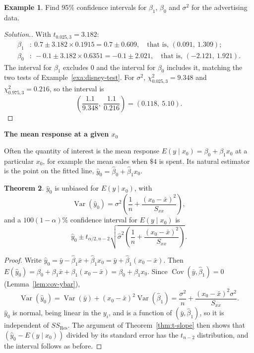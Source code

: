 \documentclass[11pt,a4paper]{article}
\numberwithin{equation}{section}
\theoremstyle{definition}
\newtheorem{thm}{Theorem}[subsection]
\newtheorem{exa}[thm]{Example}
\newenvironment{solution}
  {\renewcommand{\qedsymbol}{}\begin{proof}[\textit{Solution}.]}
  {\end{proof}}
\newcommand{\subhead}[1]{%
  \par\medskip\noindent\textbf{#1}\par\nobreak\smallskip}
\begin{document}
\begin{exa}\label{exa:disney-ci}
Find 95\% confidence intervals for $\beta_1$, $\beta_0$ and $\sigma^2$ for the advertising data.
\end{exa}

\begin{solution}
With $t_{0.025,3} = 3.182$:
\begin{align*}
\beta_1&\colon\ 0.7 \pm 3.182 \times 0.1915 = 0.7 \pm 0.609, \quad\text{that is, } (0.091,\ 1.309); \\
\beta_0&\colon\ -0.1 \pm 3.182 \times 0.6351 = -0.1 \pm 2.021, \quad\text{that is, } (-2.121,\ 1.921).
\end{align*}
The interval for $\beta_1$ excludes $0$ and the interval for $\beta_0$ includes it, matching
the two tests of Example~\ref{exa:disney-test}. For $\sigma^2$, $\chi^2_{0.025,3} = 9.348$ and
$\chi^2_{0.975,3} = 0.216$, so the interval is
\[
\left( \frac{1.1}{9.348},\ \frac{1.1}{0.216} \right) = (0.118,\ 5.10) .
\]
\end{solution}

\subhead{The mean response at a given $x_0$}
Often the quantity of interest is the mean response $E(y \mid x_0) = \beta_0 + \beta_1 x_0$ at
a particular $x_0$, for example the mean sales when $\$4$ is spent. Its natural estimator is
the point on the fitted line, $\hat y_0 = \hat\beta_0 + \hat\beta_1 x_0$.

\begin{thm}\label{thm:mean-response}
$\hat y_0$ is unbiased for $E(y \mid x_0)$, with
\[
\operatorname{Var}(\hat y_0) = \sigma^2 \left( \frac1n + \frac{(x_0 - \bar x)^2}{S_{xx}} \right),
\]
and a $100(1-\alpha)\%$ confidence interval for $E(y \mid x_0)$ is
\[
\hat y_0 \pm t_{\alpha/2, n-2} \sqrt{\hat\sigma^2 \left( \frac1n + \frac{(x_0 - \bar x)^2}{S_{xx}} \right)} .
\]
\end{thm}

\begin{proof}
Write $\hat y_0 = \bar y - \hat\beta_1 \bar x + \hat\beta_1 x_0 = \bar y + \hat\beta_1 (x_0 - \bar x)$.
Then $E(\hat y_0) = \beta_0 + \beta_1 \bar x + \beta_1 (x_0 - \bar x) = \beta_0 + \beta_1 x_0$.
Since $\operatorname{Cov}(\bar y, \hat\beta_1) = 0$ (Lemma~\ref{lem:cov-ybar}),
\[
\operatorname{Var}(\hat y_0) = \operatorname{Var}(\bar y) + (x_0 - \bar x)^2 \operatorname{Var}(\hat\beta_1)
= \frac{\sigma^2}{n} + \frac{(x_0 - \bar x)^2 \sigma^2}{S_{xx}} .
\]
$\hat y_0$ is normal, being linear in the $y_i$, and is a function of $(\bar y, \hat\beta_1)$,
so it is independent of $SS_{\mathrm{Res}}$. The argument of Theorem~\ref{thm:t-slope} then
shows that $(\hat y_0 - E(y \mid x_0))$ divided by its standard error has the $t_{n-2}$
distribution, and the interval follows as before.
\end{proof}
\end{document}
